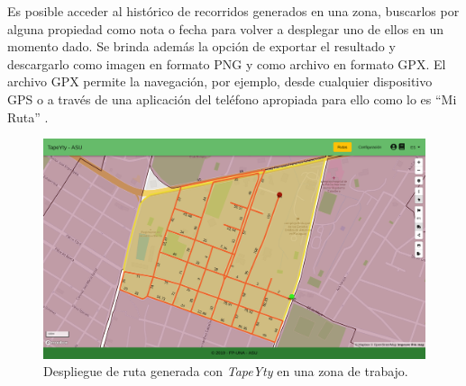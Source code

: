 Es posible acceder al histórico de recorridos generados en una zona, buscarlos por alguna propiedad como nota o fecha para volver a desplegar uno de ellos en un momento dado. Se brinda además la opción de exportar el resultado y descargarlo como imagen en formato PNG y como archivo en formato GPX. El archivo GPX permite la navegación, por ejemplo, desde cualquier dispositivo GPS o a través de una aplicación del teléfono apropiada para ello como lo es ``Mi Ruta'' \citep{MiRuta}.

\begin{figure}[H]
\centerline{\includegraphics[width=\textwidth]{generacionRuta.png}}
\caption{Despliegue de ruta generada con \textit{TapeYty} en una zona de trabajo.}
\label{fig:generacionRuta}
\end{figure}



